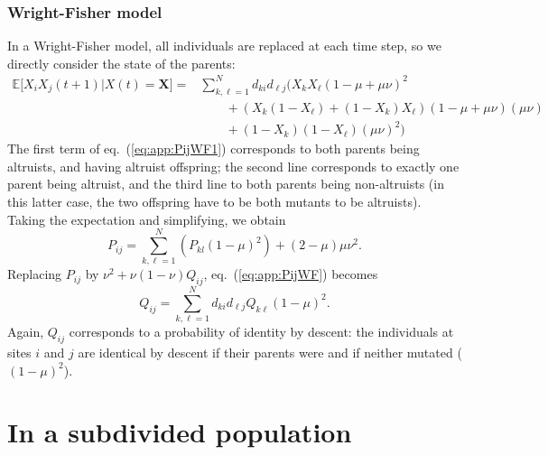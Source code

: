\documentclass[11pt, letterpaper]{article}
\renewcommand{\eqref}[1]{\textup{{\normalfont eq.~(\ref{#1}}\normalfont)}}
\newcommand{\Esp}[1]{\mathbb{E}\big[ #1\big]}%
\newcommand{\mutbias}{\nu}
\begin{document}
\subsubsection{Wright-Fisher model}

In a Wright-Fisher model, all individuals are replaced at each time step, so we directly consider the state of the parents:
\begin{align}\label{eq:app:PijWF1}
 \Esp{X_iX_j(t+1)|X(t)=\mathbf{X}} = & \sum_{k, \ell = 1}^N  d_{ki} d_{\ell j} \Bigg( X_k X_{\ell} (1-\mu+\mu \mutbias)^2 \nonumber\\ & \qquad + \left( X_k (1-X_{\ell}) + (1-X_k) X_{\ell} \right) (1-\mu+\mu \mutbias) (\mu \mutbias) \nonumber\\
 & \qquad + (1-X_k)(1-X_{\ell}) (\mu \mutbias)^2 \Bigg)
\end{align}
The first term of \eqref{eq:app:PijWF1} corresponds to both parents being altruists, and having altruist offspring; the second line corresponds to exactly one parent being altruist, and the third line to both parents being non-altruists (in this latter case, the two offspring have to be both mutants to be altruists). \\
Taking the expectation and simplifying, we obtain
\begin{equation}\label{eq:app:PijWF}
P_{ij} = \sum_{k, \ell = 1}^N \left( P_{kl} (1-\mu)^2  \right)+ (2-\mu)\mu \mutbias^2. 
\end{equation}
Replacing $P_{ij}$ by $\mutbias^2 + \mutbias (1-\mutbias) Q_{ij}$, \eqref{eq:app:PijWF} becomes
\begin{equation}\label{eq:app:QijWF}
Q_{ij} = \sum_{k, \ell=1}^N d_{ki} d_{\ell j} Q_{k\ell} (1-\mu)^2. 
\end{equation}
Again, $Q_{ij}$ corresponds to a probability of identity by descent: the individuals at sites $i$ and $j$ are identical by descent if their parents were and if neither mutated ($(1-\mu)^2$). 

\clearpage
\section{\label{sec:app:subdiv}In a subdivided population}
\end{document}
